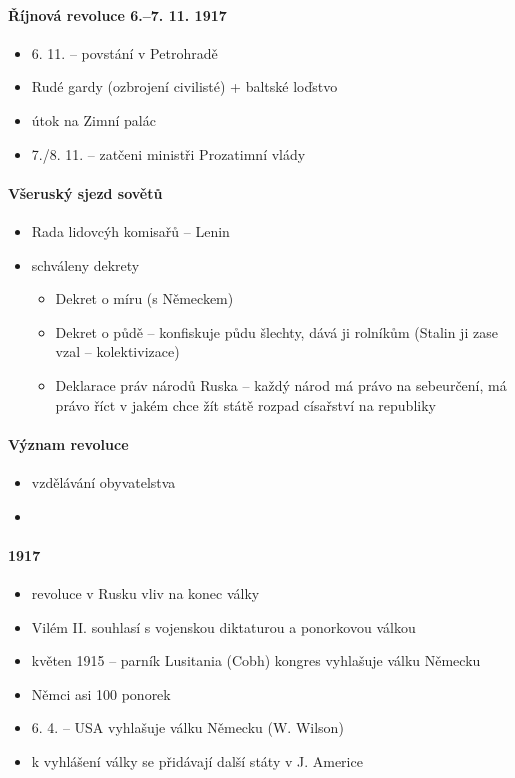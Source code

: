 \paragraph{Říjnová revoluce 6.--7. 11. 1917}
\begin{itemize}
\item 6. 11. -- povstání v Petrohradě 
\item Rudé gardy (ozbrojení civilisté) + baltské loďstvo
\item útok na Zimní palác
\item 7./8. 11. -- zatčeni ministři Prozatimní vlády
\end{itemize}

\paragraph{Všeruský sjezd sovětů}
\begin{itemize}
\item Rada lidovcýh komisařů -- Lenin
\item schváleny dekrety
	\begin{itemize}
	\item Dekret o míru (s Německem)
	\item Dekret o půdě -- konfiskuje půdu šlechty, dává ji rolníkům (Stalin ji zase vzal -- kolektivizace)
	\item Deklarace práv národů Ruska -- každý národ má právo na sebeurčení, má právo říct v jakém chce žít státě \ra rozpad císařství na republiky
	\end{itemize}
\end{itemize}

\paragraph{Význam revoluce}
\begin{itemize}
\item vzdělávání obyvatelstva
\item 
\end{itemize}

\paragraph{1917}
\begin{itemize}
\item revoluce v Rusku \ra vliv na konec války
\item Vilém II. souhlasí s vojenskou diktaturou a ponorkovou válkou
\item květen 1915 -- parník Lusitania (Cobh) \ra kongres vyhlašuje válku Německu
\item Němci asi 100 ponorek
\item 6. 4. -- USA vyhlašuje válku Německu (W. Wilson)
\item k vyhlášení války se přidávají další státy v J. Americe
\end{itemize}

